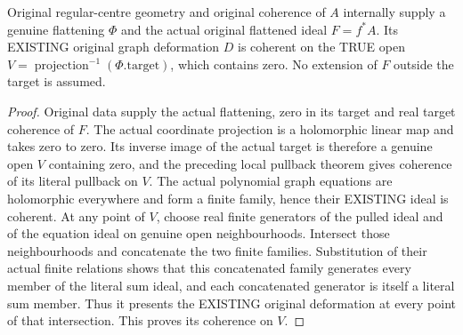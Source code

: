\begin{theorem}
\label{hir:real-domain-original-graph-deformation-coherence}
\leanok
Original regular-centre geometry and original coherence of $A$
internally supply a genuine flattening $\Phi$ and the actual original
flattened ideal $F=f^*A$. Its EXISTING original graph deformation $D$
is coherent on the TRUE open
$V=\operatorname{projection}^{-1}(\Phi.\mathrm{target})$, which
contains zero. No extension of $F$ outside the target is assumed.
\end{theorem}
\begin{proof}
Original data supply the actual flattening, zero in its target and
real target coherence of $F$. The actual coordinate projection is a
holomorphic linear map and takes zero to zero. Its inverse image of
the actual target is therefore a genuine open $V$ containing zero,
and the preceding local pullback theorem gives coherence of its
literal pullback on $V$. The actual polynomial graph equations are
holomorphic everywhere and form a finite family, hence their EXISTING
ideal is coherent. At any point of $V$, choose real finite generators
of the pulled ideal and of the equation ideal on genuine open
neighbourhoods. Intersect those neighbourhoods and concatenate the two
finite families. Substitution of their actual finite relations shows
that this concatenated family generates every member of the literal
sum ideal, and each concatenated generator is itself a literal sum
member. Thus it presents the EXISTING original deformation at every
point of that intersection. This proves its coherence on $V$.
\end{proof}

